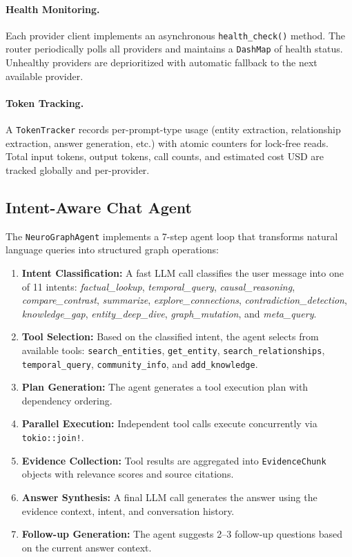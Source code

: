 \documentclass[11pt,twocolumn]{article}
\begin{document}
\paragraph{Health Monitoring.} Each provider client implements an asynchronous \texttt{health\_check()} method. The router periodically polls all providers and maintains a \texttt{DashMap} of health status. Unhealthy providers are deprioritized with automatic fallback to the next available provider.

\paragraph{Token Tracking.} A \texttt{TokenTracker} records per-prompt-type usage (entity extraction, relationship extraction, answer generation, etc.) with atomic counters for lock-free reads. Total input tokens, output tokens, call counts, and estimated cost USD are tracked globally and per-provider.

\subsection{Intent-Aware Chat Agent}
\label{sec:chat-agent}

The \texttt{NeuroGraphAgent} implements a 7-step agent loop that transforms natural language queries into structured graph operations:

\begin{enumerate}[nosep]
  \item \textbf{Intent Classification:} A fast LLM call classifies the user message into one of 11 intents: \textit{factual\_lookup}, \textit{temporal\_query}, \textit{causal\_reasoning}, \textit{compare\_contrast}, \textit{summarize}, \textit{explore\_connections}, \textit{contradiction\_detection}, \textit{knowledge\_gap}, \textit{entity\_deep\_dive}, \textit{graph\_mutation}, and \textit{meta\_query}.
  \item \textbf{Tool Selection:} Based on the classified intent, the agent selects from available tools: \texttt{search\_entities}, \texttt{get\_entity}, \texttt{search\_relationships}, \texttt{temporal\_query}, \texttt{community\_info}, and \texttt{add\_knowledge}.
  \item \textbf{Plan Generation:} The agent generates a tool execution plan with dependency ordering.
  \item \textbf{Parallel Execution:} Independent tool calls execute concurrently via \texttt{tokio::join!}.
  \item \textbf{Evidence Collection:} Tool results are aggregated into \texttt{EvidenceChunk} objects with relevance scores and source citations.
  \item \textbf{Answer Synthesis:} A final LLM call generates the answer using the evidence context, intent, and conversation history.
  \item \textbf{Follow-up Generation:} The agent suggests 2--3 follow-up questions based on the current answer context.
\end{enumerate}
\end{document}
